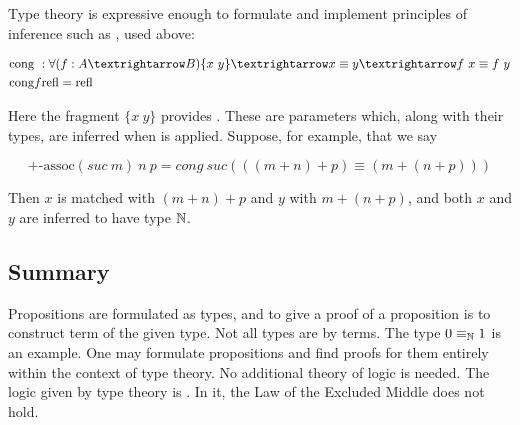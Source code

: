 Type theory is expressive enough to formulate and implement principles of inference such as , used above:

\begin{align}
&\text{cong }: \forall (f : A → B)\space \{x\ y\} → x \equiv y → f\ x \equiv f\ y \\
&\text{cong}\space f\space \text{refl} = \text{refl}
\end{align}

Here the fragment $ \{x\ y\}$ provides .  These are parameters which, along with their types, are inferred when  is applied.  Suppose, for example, that we say

$$
 \text{+-assoc} (suc\ m)\ n\ p = cong\ suc \left(((m + n) + p) \equiv (m + (n + p)) \right) 
$$

Then $x$ is matched with $(m + n) + p$ and $y$ with $m + (n + p)$, and both $x$ and $y$ are inferred to have type $\mathbb{N}$.

\subsection{Summary}

Propositions are formulated as types, and to give a proof of a proposition is to construct  term of the given type.  Not all types are   by terms.  The type $0 \equiv_{\mathbb{N}} 1$ is an example.  One may formulate propositions and find proofs for them entirely within the context of type theory.  No additional theory of logic is needed.  The logic given by type theory is .  In it, the Law of the Excluded Middle does not hold.

